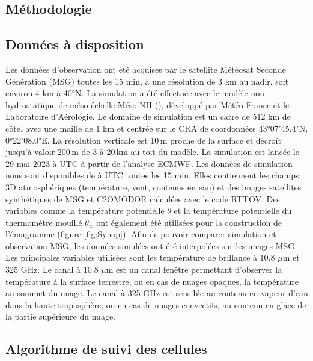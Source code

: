 \documentclass[12pt]{article}
\begin{document}
\begin{multicols}{2}

\section{Méthodologie}

\subsection{Données à disposition}

Les données d'observation ont été acquises par le satellite Météosat Seconde Génération (MSG) toutes les 15 min, à une résolution de 3 km au nadir, soit environ 4 km à 40°N. La simulation a été effectuée avec le modèle non-hydrostatique de méso-échelle Méso-NH (\cite{lac2018}), développé par Météo-France et le Laboratoire d'Aérologie. Le domaine de simulation est un carré de 512 km de côté, avec une maille de 1 km et centrée sur le CRA de coordonnées 43°07'45.4"N, 0°22'08.0"E. La résolution verticale est 10\,m proche de la surface et décroît jusqu'à valoir 200\,m de 3 à 20\,km au toit du modèle. La simulation est lancée le 29 mai 2023 à  UTC à partir de l'analyse ECMWF. Les données de simulation nous sont disponibles de  à  UTC toutes les 15 min. Elles contiennent les champs 3D atmosphériques (température, vent, contenus en eau) et des images satellites synthétiques de MSG et C2OMODOR calculées avec le code RTTOV. Des variables comme la température potentielle $\theta$ et la température potentielle du thermomètre mouillé $\theta_w$ ont également été utilisées pour la construction de l'émagramme (figure \ref{fig:Synop}). Afin de pouvoir comparer simulation et observation MSG, les données simulées ont été interpolées sur les images MSG. Les principales variables utilisées sont les température de brillance à 10.8 $\mu$m et 325 GHz. Le canal à 10.8 $\mu$m est un canal fenêtre permettant d'observer la température à la surface terrestre, ou en cas de nuages opaques, la température au sommet du nuage. Le canal à 325 GHz est sensible au contenu en vapeur d'eau dans la haute troposphère, ou en cas de nuages convectifs, au contenu en glace de la partie supérieure du nuage. 

\subsection{Algorithme de suivi des cellules}


\end{multicols}
\end{document}
